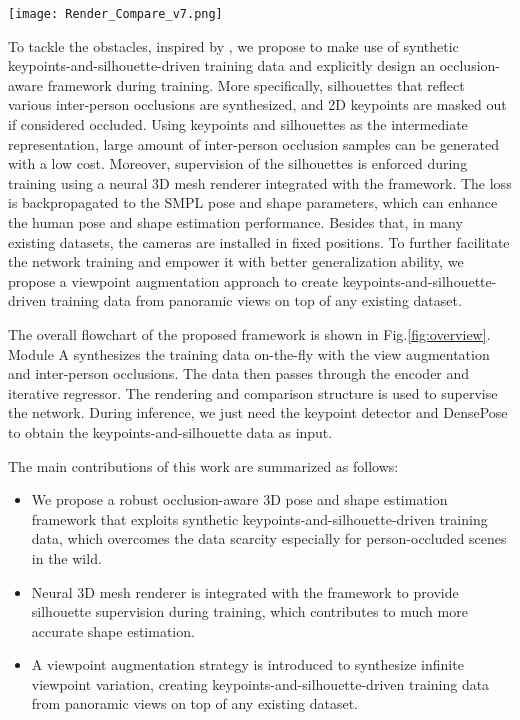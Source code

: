 \documentclass[journal]{IEEEtran}
\begin{document}
\begin{figure*}[htp]
    \centerline{\texttt{[image: Render\_Compare\_v7.png]}}
    \caption{\textbf{Overview of our method.} (A) is used to synthesize the training input. The input is then passed through the regressor network (B). We use rendering and compare the input with the rendered images in (C) to supervise the network.}
    \label{fig:overview}
\end{figure*}

To tackle the obstacles, inspired by \cite{STRAPS2020BMVC}, we propose to make use of synthetic keypoints-and-silhouette-driven training data and explicitly design an occlusion-aware framework during training. More specifically, silhouettes that reflect various inter-person occlusions are synthesized, and 2D keypoints are masked out if considered occluded. Using keypoints and silhouettes as the intermediate representation, large amount of inter-person occlusion samples can be generated with a low cost. Moreover, supervision of the silhouettes is enforced during training using a neural 3D mesh renderer integrated with the framework. The loss is backpropagated to the SMPL pose and shape parameters, which can enhance the human pose and shape estimation performance. Besides that, in many existing datasets, the cameras are installed in fixed positions. To further facilitate the network training and empower it with better generalization ability, we propose a viewpoint augmentation approach to create keypoints-and-silhouette-driven training data from panoramic views on top of any existing dataset. 

The overall flowchart of the proposed framework is shown in Fig.\ref{fig:overview}. Module A synthesizes the training data on-the-fly with the view augmentation and inter-person occlusions. The data then passes through the encoder and iterative regressor. The rendering and comparison structure is used to supervise the network. During inference, we just need the keypoint detector \cite{he2017mask} and DensePose \cite{guler2018densepose} to obtain the keypoints-and-silhouette data as input.

The main contributions of this work are summarized as follows:
\begin{itemize}
\item We propose a robust occlusion-aware 3D pose and shape estimation framework that exploits synthetic keypoints-and-silhouette-driven training data, which overcomes the data scarcity especially for person-occluded scenes in the wild.

    \item Neural 3D mesh renderer is integrated with the framework to provide silhouette supervision during training, which contributes to much more accurate shape estimation.

    \item A viewpoint augmentation strategy is introduced to synthesize infinite viewpoint variation, creating keypoints-and-silhouette-driven training data from panoramic views on top of any existing dataset.

\end{itemize}
\end{document}
